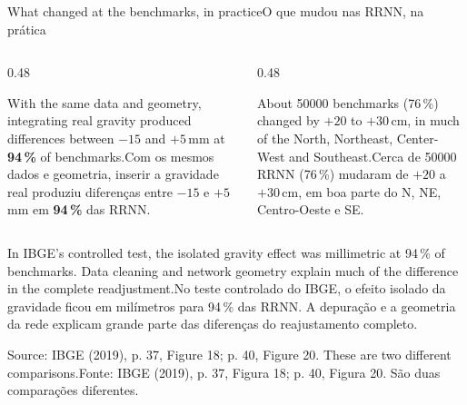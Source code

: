 \documentclass[aspectratio=169,11pt]{beamer}
\newcommand{\tr}[2]{\ifEN#2\else#1\fi}
\newcommand{\bnum}[1]{\ifmmode\textcolor{mTeal}{\mathbf{#1}}\else\textbf{\textcolor{mTeal}{#1}}\fi}
\begin{document}
\begin{frame}{\tr{O que mudou nas RRNN, na prática}{What changed at the benchmarks, in practice}}
  \begin{columns}[T]
    \begin{column}{0.48\textwidth}
      \begin{regra}[title={\tr{Isolar a inserção da gravidade}{Isolating gravity integration}}]
        \small\tr{Com os mesmos dados e geometria, inserir a gravidade real produziu
        diferenças entre $-15$ e $+5$\,mm em \bnum{94\,\%} das RRNN.}{With the same
        data and geometry, integrating real gravity produced differences between
        $-15$ and $+5$\,mm at \bnum{94\,\%} of benchmarks.}
      \end{regra}
    \end{column}
    \begin{column}{0.48\textwidth}
      \begin{cuidado}[title={\tr{O reajustamento inteiro}{The whole readjustment}}]
        \small\tr{Cerca de \num{50000} RRNN (76\,\%) mudaram de $+20$ a $+30$\,cm, em boa parte
        do N, NE, Centro-Oeste e SE.}{About \num{50000} benchmarks (76\,\%) changed by $+20$ to
        $+30$\,cm, in much of the North, Northeast, Center-West and Southeast.}
      \end{cuidado}
    \end{column}
  \end{columns}
  \bigskip

  \centering\small
  \tr{No teste controlado do IBGE, o efeito isolado da gravidade ficou em milímetros
  para 94\,\% das RRNN. A depuração e a geometria da rede explicam grande parte das
  diferenças do reajustamento completo.}{In IBGE's controlled test, the isolated gravity
  effect was millimetric at 94\,\% of benchmarks. Data cleaning and network geometry
  explain much of the difference in the complete readjustment.}
  \smallskip

  {\footnotesize\tr{Fonte: IBGE (2019), p. 37, Figura 18; p. 40, Figura 20.
  São duas comparações diferentes.}{Source: IBGE (2019), p. 37, Figure 18;
  p. 40, Figure 20. These are two different comparisons.}}
\end{frame}
\end{document}
